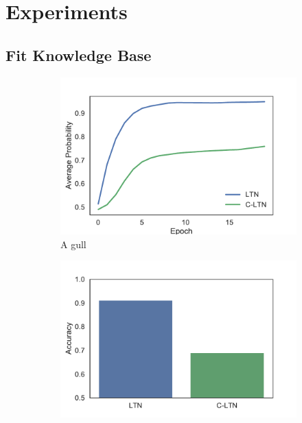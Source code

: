 
\section{Experiments}

\subsection{Fit Knowledge Base}


\begin{figure}
    \centering
    \begin{subfigure}[b]{0.3\textwidth}
        \includegraphics[]{img/curve1}
        \caption{A gull}
        \label{fig:gull}
    \end{subfigure}
    \begin{subfigure}[b]{0.3\textwidth}
        \includegraphics[]{img/bar1}

\end{subfigure}
\end{figure}
